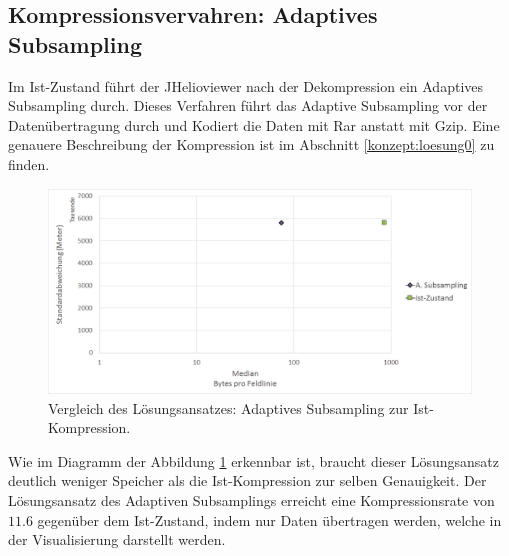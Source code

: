 \subsection{Kompressionsvervahren: Adaptives Subsampling} \label{resultate:loesung0}
Im Ist-Zustand führt der JHelioviewer nach der Dekompression ein Adaptives Subsampling durch. Dieses Verfahren führt das Adaptive Subsampling vor der Datenübertragung durch und Kodiert die Daten mit Rar anstatt mit Gzip. Eine genauere Beschreibung der Kompression ist im Abschnitt \ref{konzept:loesung0} zu finden.

\begin{figure}[!htbp]
	\center
	\includegraphics[width=1\textwidth,keepaspectratio]{./pictures/resultate/loesung0/loesung0_0.png}
	\caption{Vergleich des Lösungsansatzes: Adaptives Subsampling zur Ist-Kompression.}
	\label{resultate:loesung0:loesung0_0}
\end{figure}
Wie im Diagramm der Abbildung \ref{resultate:loesung0:loesung0_0} erkennbar ist, braucht dieser Lösungsansatz deutlich weniger Speicher als die Ist-Kompression zur selben Genauigkeit. Der Lösungsansatz des Adaptiven Subsamplings erreicht eine Kompressionsrate von $11.6$ gegenüber dem Ist-Zustand, indem nur Daten übertragen werden, welche in der Visualisierung darstellt werden.

